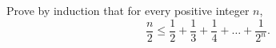 Prove by induction that for every positive integer $n$,
\[
\dfrac {n}{2}\le\dfrac{1}{2}+\dfrac{1}{3}+\dfrac{1}{4}+\dots+\dfrac{1}{2^n}.
\]
